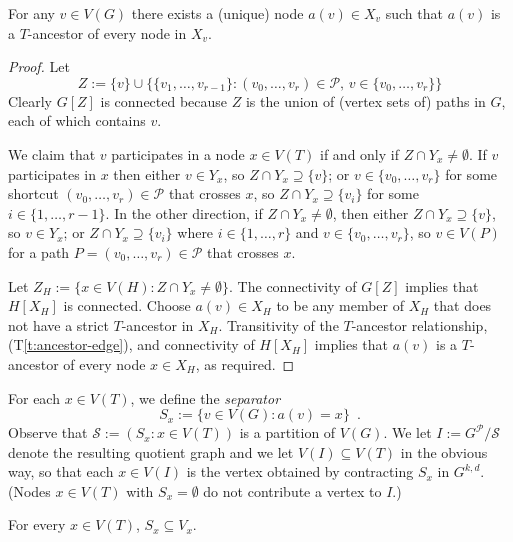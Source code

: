 \documentclass{patmorin}
\newcommand{\tref}[1]{(T\ref{t:#1})}
\begin{document}
\begin{clm}
  For any $v\in V(G)$ there exists a (unique) node $a(v)\in X_v$ such that
  $a(v)$ is a $T$-ancestor of every node in $X_v$.
\end{clm}

\begin{proof}
  Let 
  \[
     Z := \{v\} \cup \{\{v_1,\ldots,v_{r-1}\}:\mbox{$(v_0,\ldots,v_r)\in\mathcal{P}$, $v\in \{v_0,\ldots,v_r\}$}\}
  \]
  Clearly $G[Z]$ is connected because $Z$ is the union of (vertex sets of) paths in $G$, each of which contains $v$. 
  
  We claim that $v$ participates in a node $x\in V(T)$ if and only if $Z\cap Y_x\neq\emptyset$.  If $v$ participates in $x$ then either $v\in Y_x$, so $Z\cap Y_x\supseteq\{v\}$; or $v\in \{v_0,\ldots,v_r\}$ for some shortcut $(v_0,\ldots,v_r)\in\mathcal{P}$ that crosses $x$, so $Z\cap Y_x\supseteq \{v_i\}$ for some $i\in\{1,\ldots,r-1\}$.  In the other direction, if $Z\cap Y_x\neq\emptyset$, then either $Z\cap Y_x\supseteq \{v\}$, so $v\in Y_x$; or $Z\cap Y_x\supseteq \{v_i\}$ where $i\in\{1,\ldots,r\}$ and $v\in\{v_0,\ldots,v_r\}$, so $v\in V(P)$ for a path $P=(v_0,\ldots,v_r)\in\mathcal{P}$ that crosses $x$. 

  Let $Z_H:=\{x\in V(H): Z\cap Y_x\neq\emptyset\}$.  The connectivity of $G[Z]$ implies that $H[X_H]$ is connected.  
  Choose $a(v)\in X_H$ to be any member of $X_H$ that does not have a strict $T$-ancestor in $X_H$.  Transitivity of the $T$-ancestor relationship, \tref{ancestor-edge}, and connectivity of $H[X_H]$ implies that $a(v)$ is a $T$-ancestor of every node $x\in X_H$, as required.
\end{proof}

For each $x\in V(T)$, we define the \emph{separator}
\[  
     S_x := \{v\in V(G): a(v)= x\} \enspace .
\]
Observe that $\mathcal{S}:=(S_x : x\in V(T))$ is a partition of $V(G)$.  We let $I:=G^\mathcal{P}/\mathcal{S}$ denote the resulting quotient graph and we let $V(I)\subseteq V(T)$ in the obvious way, so that each $x\in V(I)$ is the vertex obtained by contracting $S_x$ in $G^{k,d}$. (Nodes $x\in V(T)$ with $S_x=\emptyset$ do not contribute a vertex to $I$.)

\begin{clm}
  For every $x\in V(T)$, $S_x\subseteq V_x$.
\end{clm}
\end{document}
